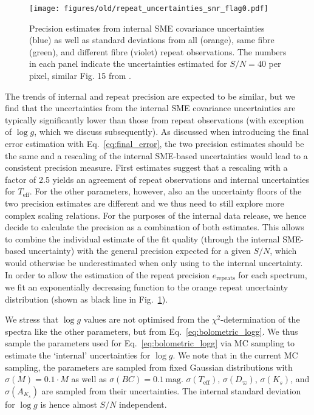 \documentclass[fleqn,usenatbib,useAMS]{mnras}
\begin{document}
\begin{figure}
\centering
\texttt{[image: figures/old/repeat\_uncertainties\_snr\_flag0.pdf]}
\caption[{Precision estimates for stellar parameters.}]{Precision estimates from internal SME covariance uncertainties (blue) as well as standard deviations from all (orange), same fibre (green), and different fibre (violet) repeat observations. The numbers in each panel indicate the uncertainties estimated for $S/N = 40$ per pixel, similar Fig. 15 from \citet{Buder2019}.}
\label{fig:precision_sp}
\end{figure}

The trends of internal and repeat precision are expected to be similar, but we find that the uncertainties from the internal SME covariance uncertainties are typically significantly lower than those from repeat observations (with exception of $\log g$, which we discuss subsequently). As discussed when introducing the final error estimation with Eq.~\ref{eq:final_error}, the two precision estimates should be the same and a rescaling of the internal SME-based uncertainties would lead to a consistent precision measure. First estimates suggest that a rescaling with a factor of 2.5 yields an agreement of repeat observations and internal uncertainties for $T_\text{eff}$. For the other parameters, however, also an the uncertainty floors of the two precision estimates are different and we thus need to still explore more complex scaling relations. For the purposes of the internal data release, we hence decide to calculate the precision as a combination of both estimates. This allows to combine the individual estimate of the fit quality (through the internal SME-based uncertainty) with the general precision expected for a given $S/N$, which would otherwise be underestimated when only using to the internal uncertainty. In order to allow the estimation of the repeat precision $e_\text{repeats}$ for each spectrum, we fit an exponentially decreasing function to the orange repeat uncertainty distribution (shown as black line in Fig.~\ref{fig:precision_sp}).

We stress that $\log g$ values are not optimised from the $\chi^2$-determination of the spectra like the other parameters, but from Eq.~\ref{eq:bolometric_logg}. We thus sample the parameters used for Eq.~\ref{eq:bolometric_logg} via MC sampling to estimate the `internal' uncertainties for $\log g$. We note that in the current MC sampling, the parameters are sampled from fixed Gaussian distributions with $\sigma (M) = 0.1\cdot M$ as well as $\sigma (BC) = 0.1\,\mathrm{mag}$. $\sigma (T_\text{eff})$, $\sigma (D_\varpi)$, $\sigma (K_s)$, and $\sigma (A_{K_s})$ are sampled from their uncertainties. The internal standard deviation for $\log g$ is hence almost $S/N$ independent.
\end{document}
